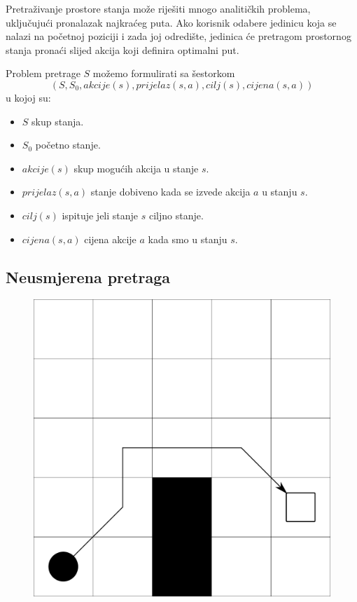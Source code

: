 \documentclass[times, utf8, zavrsni, numeric]{fer}
\begin{document}
\par Pretraživanje prostore stanja može riješiti mnogo analitičkih problema, uključujući pronalazak najkraćeg puta. 
Ako korisnik odabere jedinicu koja se nalazi na početnoj poziciji i zada joj odredište, jedinica će pretragom prostornog stanja pronaći slijed akcija koji definira optimalni put.

\par Problem pretrage \(S\) možemo formulirati sa šestorkom
\[(S, S_0, akcije(s), prijelaz(s, a), cilj(s), cijena(s, a))\]
u kojoj su:
\begin{itemize}
    \item \(S\) skup stanja.
    \item \(S_0\) početno stanje.
    \item \(akcije(s)\) skup mogućih akcija u stanje \(s\).
    \item \(prijelaz(s, a)\) stanje dobiveno kada se izvede akcija \(a\) u stanju \(s\).
    \item \(cilj(s)\) ispituje jeli stanje \(s\) ciljno stanje.
    \item \(cijena(s, a)\) cijena akcije \(a\) kada smo u stanju \(s\). 
\end{itemize}

\subsection{Neusmjerena pretraga}

\begin{figure}[h] 
	\centering
	\includegraphics[width=0.3\linewidth]{images/basicGrid.pdf}
	\caption{}
	\label{fig:basicGrid}
\end{figure} 
\end{document}
